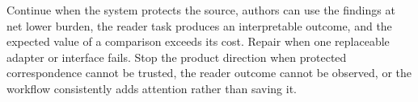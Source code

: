 Continue when the system protects the source, authors can use the findings at
net lower burden, the reader task produces an interpretable outcome, and the
expected value of a comparison exceeds its cost. Repair when one replaceable
adapter or interface fails. Stop the product direction when protected
correspondence cannot be trusted, the reader outcome cannot be observed, or the
workflow consistently adds attention rather than saving it.
